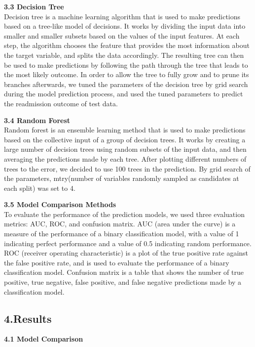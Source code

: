 \documentclass[
]{article}
\begin{document}
\textbf{3.3 Decision Tree}\\
Decision tree is a machine learning algorithm that is used to make
predictions based on a tree-like model of decisions. It works by
dividing the input data into smaller and smaller subsets based on the
values of the input features. At each step, the algorithm chooses the
feature that provides the most information about the target variable,
and splits the data accordingly. The resulting tree can then be used to
make predictions by following the path through the tree that leads to
the most likely outcome. In order to allow the tree to fully grow and to
prune its branches afterwards, we tuned the parameters of the decision
tree by grid search during the model prediction process, and used the
tuned parameters to predict the readmission outcome of test data.

\textbf{3.4 Random Forest}\\
Random forest is an ensemble learning method that is used to make
predictions based on the collective input of a group of decision trees.
It works by creating a large number of decision trees using random
subsets of the input data, and then averaging the predictions made by
each tree. After plotting different numbers of trees to the error, we
decided to use 100 trees in the prediction. By grid search of the
parameters, mtry(number of variables randomly sampled as candidates at
each split) was set to 4.

\textbf{3.5 Model Comparison Methods}\\
To evaluate the performance of the prediction models, we used three
evaluation metrics: AUC, ROC, and confusion matrix. AUC (area under the
curve) is a measure of the performance of a binary classification model,
with a value of 1 indicating perfect performance and a value of 0.5
indicating random performance. ROC (receiver operating characteristic)
is a plot of the true positive rate against the false positive rate, and
is used to evaluate the performance of a binary classification model.
Confusion matrix is a table that shows the number of true positive, true
negative, false positive, and false negative predictions made by a
classification model.

\hypertarget{results}{%
\subsection{4.Results}\label{results}}

\textbf{4.1 Model Comparison}\\
\end{document}
